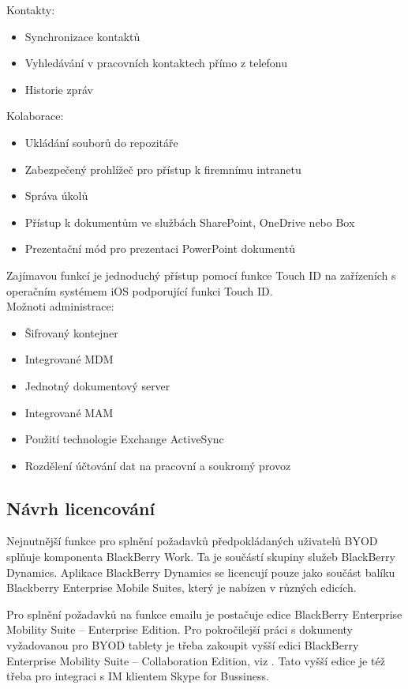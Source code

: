 Kontakty:
\begin{itemize}
   \item Synchronizace kontaktů
   \item Vyhledávání v pracovních kontaktech přímo z telefonu
   \item Historie zpráv
\end{itemize}

Kolaborace:
\begin{itemize}
   \item Ukládání souborů do repozitáře
   \item Zabezpečený prohlížeč pro přístup k firemnímu intranetu
   \item Správa úkolů
   \item Přístup k dokumentům ve službách SharePoint, OneDrive nebo Box
   \item Prezentační mód pro prezentaci PowerPoint dokumentů
\end{itemize}

Zajímavou funkcí je jednoduchý přístup pomocí funkce Touch ID na zařízeních s operačním systémem iOS podporující funkci Touch ID.\\

Možnoti administrace:
\begin{itemize}
   \item Šifrovaný kontejner
   \item Integrované MDM
   \item Jednotný dokumentový server
   \item Integrované MAM
   \item Použití technologie Exchange ActiveSync
   \item Rozdělení účtování dat na pracovní a soukromý provoz
\end{itemize}

\subsection{Návrh licencování}

Nejnutnější funkce pro splnění požadavků předpokládaných uživatelů BYOD splňuje komponenta BlackBerry Work. Ta je součástí skupiny služeb BlackBerry Dynamics. Aplikace BlackBerry Dynamics se licencují pouze jako součást balíku Blackberry Enterprise Mobile Suites, který je nabízen v různých edicích.

Pro splnění požadavků na funkce emailu je postačuje edice BlackBerry Enterprise Mobility Suite --  Enterprise Edition. Pro pokročilejší práci s dokumenty vyžadovanou pro BYOD tablety je třeba zakoupit vyšší edici BlackBerry Enterprise Mobility Suite -- Collaboration Edition, viz . Tato vyšší edice je též třeba pro integraci s IM klientem Skype for Bussiness.

